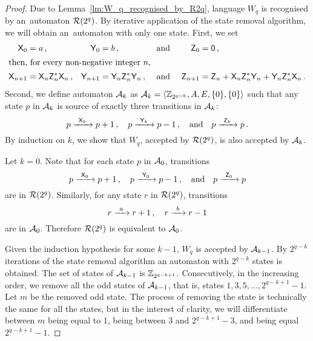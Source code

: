 \begin{proof}
    Due to Lemma~\ref*{lm:W_q_recognised_by_R2q}, language $W_q$ is recognised by an~automaton ${\mathcal{R}}(2^q)$. By iterative application of the state removal algorithm, we will obtain an~automaton with only one state. First, we set
    \begin{align*}
        {\mathsf{X}}_0 &= a \, , & {\mathsf{Y}}_0 &= b \, , & &\text{ and } & {\mathsf{Z}}_0 &= {\mathsf{0}} \, , \\
    \intertext{then, for every non-negative integer $n$,}
        {\mathsf{X}}_{n+1} &= {\mathsf{X}}_n {\mathsf{Z}}_n^* {\mathsf{X}}_n \, , & {\mathsf{Y}}_{n+1} &= {\mathsf{Y}}_n {\mathsf{Z}}_n^* {\mathsf{Y}}_n \, , & &\text{ and } & {\mathsf{Z}}_{n+1} &= {\mathsf{Z}}_n + {\mathsf{X}}_n {\mathsf{Z}}_n^* {\mathsf{Y}}_n + {\mathsf{Y}}_n {\mathsf{Z}}_n^* {\mathsf{X}}_n \, .
    \end{align*}
    Second, we define automaton ${\mathcal{A}}_k$ as ${\mathcal{A}}_k = \langle \mathbb{Z}_{2^{q-k}}, A, E, \{0\}, \{0\} \rangle$ such that any state $p$ in ${\mathcal{A}}_k$ is source of exactly three transitions in ${\mathcal{A}}_k$:
    \[
        p {\; \xrightarrow[]{\: \; {\mathsf{X}}_k \: \;} \;} p+1 \, , \quad p {\; \xrightarrow[]{\: \; {\mathsf{Y}}_k \: \;} \;} p-1 \, , \quad \text{and} \quad p {\; \xrightarrow[]{\: \; {\mathsf{Z}}_k \: \;} \;} p \, .
    \]
    By induction on $k$, we show that $W_q$, accepted by ${\mathcal{R}}(2^q)$, is also accepted by ${\mathcal{A}}_k$.

    Let $k = 0$. Note that for each state $p$ in ${\mathcal{A}}_0$, transitions
    \[
        p {\; \xrightarrow[]{\: \; {\mathsf{X}}_0 \: \;} \;} p+1 \, , \quad p {\; \xrightarrow[]{\: \; {\mathsf{Y}}_0 \: \;} \;} p-1 \, , \quad \text{and} \quad p {\; \xrightarrow[]{\: \; {\mathsf{Z}}_0 \: \;} \;} p
    \]
    are in ${\mathcal{R}}(2^q)$. Similarly, for any state $r$ in ${\mathcal{R}}(2^q)$, transitions
    \[
        r {\; \xrightarrow[]{\: \; a \: \;} \;} r+1 \, , \quad r {\; \xrightarrow[]{\: \; b \: \;} \;} r-1
    \]
    are in ${\mathcal{A}}_0$. Therefore ${\mathcal{R}}(2^q)$ is equivalent to ${\mathcal{A}}_0$.

    Given the induction hypothesis for some $k - 1$, $W_q$ is accepted by ${\mathcal{A}}_{k-1}$. By $2^{q-k}$ iterations of the state removal algorithm an automaton with $2^{q-k}$ states is obtained. The set of states of ${\mathcal{A}}_{k-1}$ is $\mathbb{Z}_{2^{q-k+1}}$. Consecutively, in the increasing order, we remove all the odd states of ${\mathcal{A}}_{k-1}$, that is, states $1, 3, 5, \dotsc, 2^{q-k+1}-1$. Let $m$ be the removed odd state. The process of removing the state is technically the same for all the states, but in the interest of clarity, we will differentiate between $m$ being equal to $1$, being between $3$ and $2^{q-k+1}-3$, and being equal $2^{q-k+1}-1$.


\end{proof}
